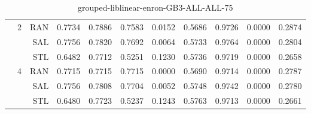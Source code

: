\begin{center}
\begin{table}[htbp]
\begin{center}
\begin{tabular}{ | r | r | r | r | r | r | r | r | r | r | r |}
 & \multirow{3}{*}{2} & RAN & 0.7734 & 0.7886 & 0.7583 & 0.0152 & 0.5686 & 0.9726 & 0.0000 & 0.2874\\ \cline{3-11}
 &   & SAL & 0.7756 & 0.7820 & 0.7692 & 0.0064 & 0.5733 & 0.9764 & 0.0000 & 0.2804\\ \cline{3-11}
 &   & STL & 0.6482 & 0.7712 & 0.5251 & 0.1230 & 0.5736 & 0.9719 & 0.0000 & 0.2658\\ \cline{2-11}
 & \multirow{3}{*}{4} & RAN & 0.7715 & 0.7715 & 0.7715 & 0.0000 & 0.5690 & 0.9714 & 0.0000 & 0.2787\\ \cline{3-11}
 &   & SAL & 0.7756 & 0.7808 & 0.7704 & 0.0052 & 0.5748 & 0.9742 & 0.0000 & 0.2780\\ \cline{3-11}
 &   & STL & 0.6480 & 0.7723 & 0.5237 & 0.1243 & 0.5763 & 0.9713 & 0.0000 & 0.2661\\ \cline{2-11}
\hline
\end{tabular}
\caption{grouped-liblinear-enron-GB3-ALL-ALL-75}
\end{center}
 \end{table}
\end{center}

